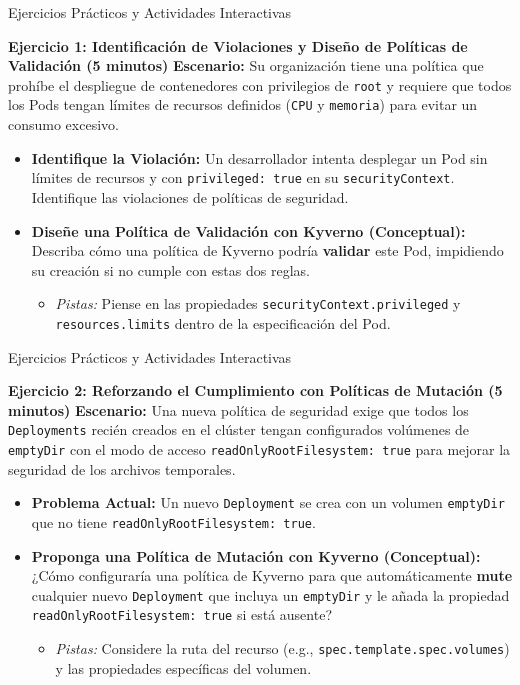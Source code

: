 \documentclass[aspectratio=169]{beamer}
\begin{document}
\begin{frame}{Ejercicios Prácticos y Actividades Interactivas}


\textbf{Ejercicio 1: Identificación de Violaciones y Diseño de Políticas de Validación (5 minutos)}
\textbf{Escenario:} Su organización tiene una política que prohíbe el despliegue de contenedores con privilegios de \texttt{root} y requiere que todos los Pods tengan límites de recursos definidos (\texttt{CPU} y \texttt{memoria}) para evitar un consumo excesivo.

\begin{itemize}
  \item \textbf{Identifique la Violación:} Un desarrollador intenta desplegar un Pod sin límites de recursos y con \texttt{privileged: true} en su \texttt{securityContext}. Identifique las violaciones de políticas de seguridad.
  \item \textbf{Diseñe una Política de Validación con Kyverno (Conceptual):} Describa cómo una política de Kyverno podría \textbf{validar} este Pod, impidiendo su creación si no cumple con estas dos reglas.
  \begin{itemize}
    \item \textit{Pistas:} Piense en las propiedades \texttt{securityContext.privileged} y \texttt{resources.limits} dentro de la especificación del Pod.
  \end{itemize}
\end{itemize}
\end{frame}

\begin{frame}{Ejercicios Prácticos y Actividades Interactivas}


\textbf{Ejercicio 2: Reforzando el Cumplimiento con Políticas de Mutación (5 minutos)}
\textbf{Escenario:} Una nueva política de seguridad exige que todos los \texttt{Deployments} recién creados en el clúster tengan configurados volúmenes de \texttt{emptyDir} con el modo de acceso \texttt{readOnlyRootFilesystem: true} para mejorar la seguridad de los archivos temporales.

\begin{itemize}
  \item \textbf{Problema Actual:} Un nuevo \texttt{Deployment} se crea con un volumen \texttt{emptyDir} que no tiene \texttt{readOnlyRootFilesystem: true}.
  \item \textbf{Proponga una Política de Mutación con Kyverno (Conceptual):} ¿Cómo configuraría una política de Kyverno para que automáticamente \textbf{mute} cualquier nuevo \texttt{Deployment} que incluya un \texttt{emptyDir} y le añada la propiedad \texttt{readOnlyRootFilesystem: true} si está ausente?
  \begin{itemize}
    \item \textit{Pistas:} Considere la ruta del recurso (e.g., \texttt{spec.template.spec.volumes}) y las propiedades específicas del volumen.
  \end{itemize}
\end{itemize}
\end{frame}
\end{document}
